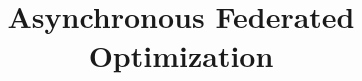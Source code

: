 \documentclass{opt2020} %
\title[Asynchronous Federated Optimization]{Asynchronous Federated Optimization}
\begin{document}
\allowdisplaybreaks

\maketitle


\def\Blue{\color{blue}}
\def\Purple{\color{purple}}

\def\A{{\bf A}}
\def\a{{\bf a}}
\def\B{{\bf B}}
\def\C{{\bf C}}
\def\c{{\bf c}}
\def\D{{\bf D}}
\def\d{{\bf d}}
\def\E{{\mathbb{E}}}
\def\F{{\bf F}}
\def\e{{\bf e}}
\def\f{{\bf f}}
\def\G{{\bf G}}
\def\H{{\bf H}}
\def\I{{\bf I}}
\def\K{{\bf K}}
\def\L{{\bf L}}
\def\M{{\bf M}}
\def\m{{\bf m}}
\def\N{{\bf N}}
\def\n{{\bf n}}
\def\Q{{\bf Q}}
\def\q{{\bf q}}
\def\R{{\mathbb{R}}}
\def\S{{\bf S}}
\def\s{{\bf s}}
\def\T{{\bf T}}
\def\U{{\bf U}}
\def\u{{\bf u}}
\def\V{{\bf V}}
\def\v{{\bf v}}
\def\W{{\bf W}}
\def\w{{\bf w}}
\def\X{{\bf X}}
\def\x{{\bf x}}
\def\bx{{\bar{x}}}
\def\Y{{\bf Y}}
\def\y{{\bf y}}
\def\Z{{\bf Z}}
\def\z{{\bf z}}
\def\0{{\bf 0}}
\def\1{{\bf 1}}

\def\AM{{\mathcal A}}
\def\CM{{\mathcal C}}
\def\DM{{\mathcal D}}
\def\GM{{\mathcal G}}
\def\FM{{\mathcal F}}
\def\IM{{\mathcal I}}
\def\NM{{\mathcal N}}
\def\OM{{\mathcal O}}
\def\SM{{\mathcal S}}
\def\TM{{\mathcal T}}
\def\UM{{\mathcal U}}
\def\XM{{\mathcal X}}
\def\YM{{\mathcal Y}}
\def\RB{{\mathbb R}}

\def\TX{\tilde{\bf X}}
\def\tx{\tilde{\bf x}}
\def\ty{\tilde{\bf y}}
\def\TZ{\tilde{\bf Z}}
\def\tz{\tilde{\bf z}}
\def\hd{\hat{d}}
\def\HD{\hat{\bf D}}
\def\hx{\hat{\bf x}}
\def\TD{\tilde{\Delta}}
\def\tg{\tilde{g}}
\def\tmu{\tilde{\mu}}

\def\alp{\mbox{\boldmath$\alpha$\unboldmath}}
\def\bet{\mbox{\boldmath$\beta$\unboldmath}}
\def\epsi{\mbox{\boldmath$\epsilon$\unboldmath}}
\def\etab{\mbox{\boldmath$\eta$\unboldmath}}
\def\ph{\mbox{\boldmath$\phi$\unboldmath}}
\def\pii{\mbox{\boldmath$\pi$\unboldmath}}
\def\Ph{\mbox{\boldmath$\Phi$\unboldmath}}
\def\Ps{\mbox{\boldmath$\Psi$\unboldmath}}
\def\tha{\mbox{\boldmath$\theta$\unboldmath}}
\def\Tha{\mbox{\boldmath$\Theta$\unboldmath}}
\def\muu{\mbox{\boldmath$\mu$\unboldmath}}
\def\Si{\mbox{\boldmath$\Sigma$\unboldmath}}
\def\si{\mbox{\boldmath$\sigma$\unboldmath}}
\def\Gam{\mbox{\boldmath$\Gamma$\unboldmath}}
\def\Lam{\mbox{\boldmath$\Lambda$\unboldmath}}
\def\De{\mbox{\boldmath$\Delta$\unboldmath}}
\def\Ome{\mbox{\boldmath$\Omega$\unboldmath}}
\def\TOme{\mbox{\boldmath$\hat{\Omega}$\unboldmath}}
\def\vps{\mbox{\boldmath$\varepsilon$\unboldmath}}
\newcommand{\ti}[1]{\tilde{#1}}
\def\Ncal{\mathcal{N}}
\def\argmax{\mathop{\rm argmax}}
\def\argmin{\mathop{\rm argmin}}
\providecommand{\abs}[1]{\lvert#1\rvert}
\providecommand{\norm}[2]{\lVert#1\rVert_{#2}}
\end{document}
